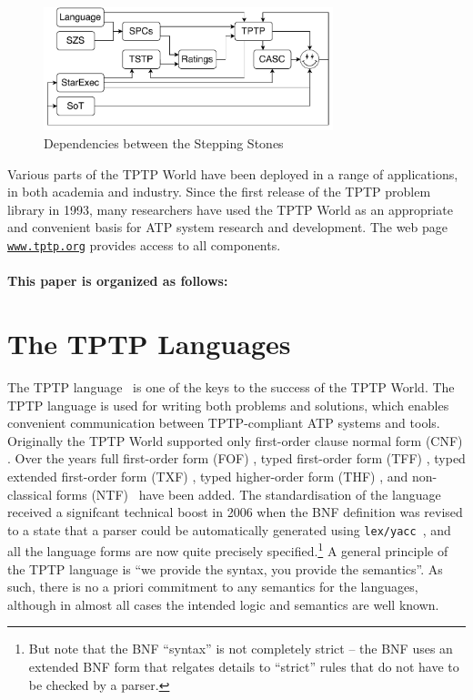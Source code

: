 \documentclass{easychair}
\begin{document}
\begin{figure}[htbp]
\centering
\includegraphics[width=0.75\textwidth]{Dependencies.pdf}
\caption{Dependencies between the Stepping Stones}
\label{Dependencies}
\end{figure}

Various parts of the TPTP World have been deployed in a range of applications, in both academia 
and industry.
Since the first release of the TPTP problem library in 1993, many researchers have used the 
TPTP World as an appropriate and convenient basis for ATP system research and development. 
The web page \href{http://www.tptp.org}{{\tt www.tptp.org}} provides access to all components.

\paragraph{This paper is organized as follows:}

\section{The TPTP Languages}
\label{Languages}

The TPTP language~\cite{Sut23-IGPL} is one of the keys to the success of the TPTP World.
The TPTP language is used for writing both problems and solutions,
which enables convenient communication between TPTP-compliant ATP systems and tools.
Originally the TPTP World supported only first-order clause normal form (CNF)
\cite{SS98-JAR}.
Over the years full first-order form (FOF)
\cite{Sut09}, 
typed first-order form (TFF)
\cite{SS+12,BP13-TFF1}, 
typed extended first-order form (TXF)
\cite{SK18}, 
typed higher-order form (THF)
\cite{SB10,KSR16}, 
and non-classical forms (NTF)~\cite{SF+22} have been added.
The standardisation of the language received a signifcant technical boost in 2006 when the BNF
definition was revised to a state that a parser could be automatically generated using
{\tt lex/yacc}~\cite{VS06}, and all the language forms are now quite precisely 
specified.\footnote{%
But note that the BNF ``syntax'' is not completely strict -- the BNF uses an extended BNF form
that relgates details to ``strict'' rules that do not have to be checked by a parser.}
A general principle of the TPTP language is ``we provide the syntax, you provide the semantics''.
As such, there is no a priori commitment to any semantics for the languages, although in almost 
all cases the intended logic and semantics are well known.
\end{document}
